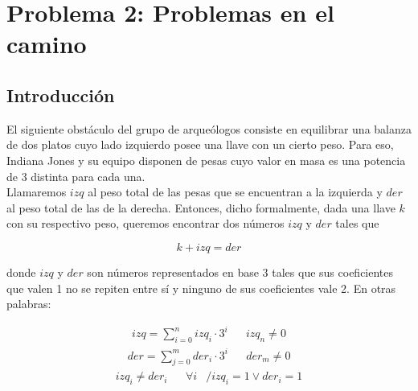 \section{Problema 2: Problemas en el camino}

\subsection{Introducción}
	El siguiente obstáculo del grupo de arqueólogos consiste en equilibrar una balanza de dos platos cuyo lado izquierdo posee una llave con un cierto peso. Para eso, Indiana Jones y su equipo disponen de pesas cuyo valor en masa es una potencia de 3 distinta para cada una. \\
	Llamaremos $izq$ al peso total de las pesas que se encuentran a la izquierda y $der$ al peso total de las de la derecha.
	Entonces, dicho formalmente, dada una llave $k$ con su respectivo peso, queremos encontrar dos números $izq$ y $der$ tales que

	$$k + izq = der$$

	donde $izq$ y $der$ son números representados en base 3 tales que sus coeficientes que valen 1 no se repiten entre sí y ninguno de sus coeficientes vale 2. En otras palabras:

	
	\begin{align*}
	izq = \sum_{i=0}^n izq_i \cdot 3^i && izq_n \neq 0
	\end{align*}
	\begin{align*}
	der = \sum_{j=0}^m der_i \cdot 3^i && der_m \neq 0
	\end{align*}
	\begin{align*}
	izq_i \neq der_i && \forall i & / izq_i = 1 \lor der_i = 1
	\end{align*}